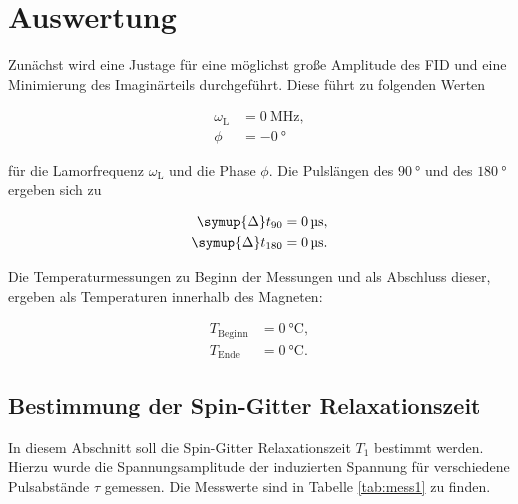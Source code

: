 \section{Auswertung}
\label{sec:Auswertung}

Zunächst wird eine Justage für eine möglichst große Amplitude des FID und eine Minimierung des Imaginärteils durchgeführt. 
Diese führt zu folgenden Werten

\begin{align}
  \omega_\text{L} &= \SI{0}{\mega\hertz},\\
  \phi &= \SI{-0}{\degree}
\end{align}

für die Lamorfrequenz $\omega_\text{L}$ und die Phase $\phi$. Die Pulslängen des $\SI{90}{\degree}$ und des $\SI{180}{\degree}$
ergeben sich zu 

\begin{align}
  \symup{\Delta} t_{90} &= \SI{0}{\micro\second},\\
  \symup{\Delta} t_{180} &= \SI{0}{\micro\second}.
\end{align}

Die Temperaturmessungen zu Beginn der Messungen und als Abschluss dieser, ergeben als Temperaturen innerhalb des Magneten: 

\begin{align}
  T_\text{Beginn} &= \SI{0}{\celsius},\\
  T_\text{Ende} &= \SI{0}{\celsius}.
\end{align}

\subsection{Bestimmung der Spin-Gitter Relaxationszeit}

In diesem Abschnitt soll die Spin-Gitter Relaxationszeit $T_1$ bestimmt werden. Hierzu wurde die Spannungsamplitude der 
induzierten Spannung für verschiedene Pulsabstände $\tau$ gemessen. Die Messwerte sind in Tabelle \ref{tab:mess1} zu finden.

